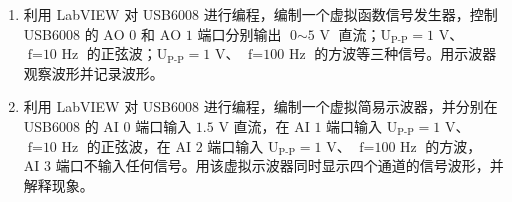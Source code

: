 \documentclass[a4paper,8pt,twocolumn]{article}
\begin{document}
\begin{enumerate}
\begin{enumerate}
        \item 利用 LabVIEW 对 USB6008 进行编程，编制一个虚拟函数信号发生器，控制 USB6008 的 $\text{AO 0}$ 和 $\text{AO 1}$ 端口分别输出 $\text{0} \sim \text{5 V}$ 直流；$\text{U}_{\text{P-P}} = \text{1 V}$、 $\text{f} = \text{10 Hz}$ 的正弦波；$\text{U}_{\text{P-P}} = \text{1 V}$、 $\text{f} = \text{100 Hz}$ 的方波等三种信号。用示波器观察波形并记录波形。
        \item 利用 LabVIEW 对 USB6008 进行编程，编制一个虚拟简易示波器，并分别在 USB6008 的 $\text{AI 0}$ 端口输入 $\text{1.5 V}$ 直流，在 $\text{AI 1}$ 端口输入 $\text{U}_{\text{P-P}} = \text{1 V}$、 $\text{f} = \text{10 Hz}$ 的正弦波，在 $\text{AI 2}$ 端口输入 $\text{U}_{\text{P-P}} = \text{1 V}$、 $\text{f} = \text{100 Hz}$ 的方波，$\text{AI 3}$ 端口不输入任何信号。用该虚拟示波器同时显示四个通道的信号波形，并解释现象。
    \end{enumerate}
\end{enumerate}
\end{document}

